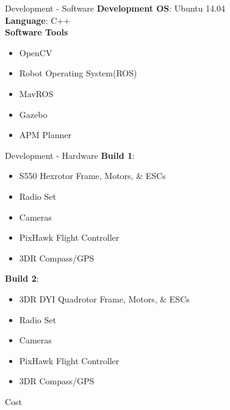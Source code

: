 \documentclass[11pt]{beamer}
\begin{document}
\begin{frame}{Development - Software}
\textbf{Development OS}: Ubuntu 14.04\\
\textbf{Language}: C++\\
\vspace{5mm}
\textbf{Software Tools}
\begin{itemize}
\item OpenCV
\item Robot Operating System(ROS)
\item MavROS
\item Gazebo
\item APM Planner
\end{itemize}
\end{frame}

\begin{frame}{Development - Hardware}
\textbf{Build 1}:
\begin{itemize}
\item S550 Hexrotor Frame, Motors, \& ESCs
\item Radio Set
\item Cameras
\item PixHawk Flight Controller
\item 3DR Compass/GPS
\end{itemize}
\vspace{5mm}
\textbf{Build 2}:
\begin{itemize}
\item 3DR DYI Quadrotor Frame, Motors, \& ESCs
\item Radio Set
\item Cameras
\item PixHawk Flight Controller
\item 3DR Compass/GPS
\end{itemize}

\end{frame}

\begin{frame}{Cost}
\end{frame}
\end{document}
